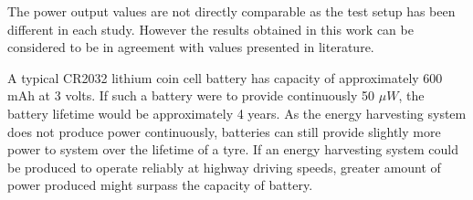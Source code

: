 The power output values are not directly comparable as the test setup has been different in each study. However the results obtained in this work can be considered to be in agreement with values presented in literature. 

A typical CR2032 lithium coin cell battery has capacity of approximately 600 mAh at 3 volts. If such a battery were to provide continuously 50 $\mu W$, the battery lifetime would be approximately 4 years. As the energy harvesting system does not produce power continuously, batteries can still provide slightly more power to system over the lifetime of a tyre. If an energy harvesting system could be produced to operate reliably at highway driving speeds, greater amount of power produced might surpass the capacity of battery.
